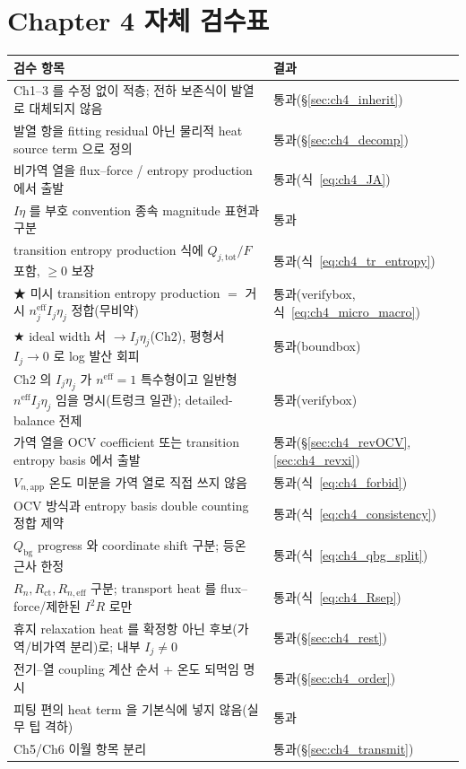\documentclass[11pt,a4paper]{article}
\newcommand{\eff}{\mathrm{eff}}
\newcommand{\app}{\mathrm{app}}
\newcommand{\tot}{\mathrm{tot}}
\newcommand{\bg}{\mathrm{bg}}
\newcommand{\ct}{\mathrm{ct}}
\begin{document}
\section{Chapter 4 자체 검수표}\label{sec:ch4_selfcheck}
{\small
\begin{longtable}{p{} p{}}
\toprule 검수 항목 & 결과 \\ \midrule \endhead
Ch1--3 를 수정 없이 적층; 전하 보존식이 발열로 대체되지 않음 & 통과(\S\ref{sec:ch4_inherit}) \\
발열 항을 fitting residual 아닌 물리적 heat source term 으로 정의 & 통과(\S\ref{sec:ch4_decomp}) \\
비가역 열을 flux--force / entropy production 에서 출발 & 통과(식~\eqref{eq:ch4_JA}) \\
$I\eta$ 를 부호 convention 종속 magnitude 표현과 구분 & 통과 \\
transition entropy production 식에 $Q_{j,\tot}/F$ 포함, $\ge0$ 보장 & 통과(식~\eqref{eq:ch4_tr_entropy}) \\
★ 미시 transition entropy production $=$ 거시 $n_j^{\eff}I_j\eta_j$ 정합(무비약) & 통과(verifybox,식~\eqref{eq:ch4_micro_macro}) \\
★ ideal width 서 $\to I_j\eta_j$(Ch2), 평형서 $I_j\to0$ 로 log 발산 회피 & 통과(boundbox) \\
Ch2 의 $I_j\eta_j$ 가 $n^{\eff}{=}1$ 특수형이고 일반형 $n^{\eff}I_j\eta_j$ 임을 명시(트렁크 일관); detailed-balance 전제 & 통과(verifybox) \\
가역 열을 OCV coefficient 또는 transition entropy basis 에서 출발 & 통과(\S\ref{sec:ch4_revOCV},\ref{sec:ch4_revxi}) \\
$V_{n,\app}$ 온도 미분을 가역 열로 직접 쓰지 않음 & 통과(식~\eqref{eq:ch4_forbid}) \\
OCV 방식과 entropy basis double counting 정합 제약 & 통과(식~\eqref{eq:ch4_consistency}) \\
$Q_\bg$ progress 와 coordinate shift 구분; 등온 근사 한정 & 통과(식~\eqref{eq:ch4_qbg_split}) \\
$R_n,R_{\ct},R_{n,\eff}$ 구분; transport heat 를 flux--force/제한된 $I^2R$ 로만 & 통과(식~\eqref{eq:ch4_Rsep}) \\
휴지 relaxation heat 를 확정항 아닌 후보(가역/비가역 분리)로; 내부 $I_j\ne0$ & 통과(\S\ref{sec:ch4_rest}) \\
전기--열 coupling 계산 순서 + 온도 되먹임 명시 & 통과(\S\ref{sec:ch4_order}) \\
피팅 편의 heat term 을 기본식에 넣지 않음(실무 팁 격하) & 통과 \\
Ch5/Ch6 이월 항목 분리 & 통과(\S\ref{sec:ch4_transmit}) \\
\bottomrule
\end{longtable}
}
\end{document}
